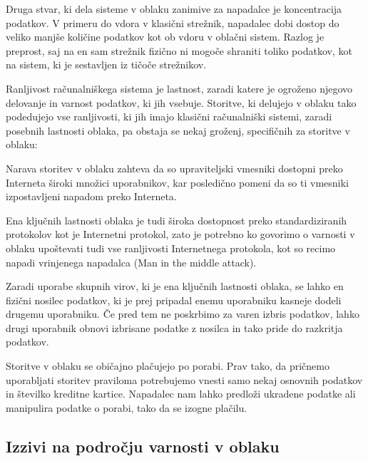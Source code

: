 \documentclass[12pt,a4paper,openany]{book}
\begin{document}
Druga stvar, ki dela sisteme v oblaku zanimive za napadalce je koncentracija podatkov. V primeru do vdora v klasični strežnik, napadalec dobi dostop do veliko manjše količine podatkov kot ob vdoru v oblačni sistem. Razlog je preprost, saj na en sam strežnik fizično ni mogoče shraniti toliko podatkov, kot na sistem, ki je sestavljen iz tičoče strežnikov.

Ranljivost računalniškega sistema je lastnost, zaradi katere je ogroženo njegovo delovanje in varnost podatkov, ki jih vsebuje. Storitve, ki delujejo v oblaku tako podedujejo vse ranljivosti, ki jih imajo klasični računalniški sistemi, zaradi posebnih lastnosti oblaka, pa obstaja se nekaj groženj, specifičnih za storitve v oblaku:

\begin{description}[style=nextline]

\item[Nedovoljen dostop do upraviteljskega in programskega vmesnika] Narava storitev v oblaku zahteva da so upraviteljski vmesniki dostopni preko Interneta široki množici uporabnikov, kar posledično pomeni da so ti vmesniki izpostavljeni napadom preko Interneta.

\item[Ranljivosti internetnega protokola] Ena ključnih lastnosti oblaka je tudi široka dostopnost preko standardiziranih protokolov kot je Internetni protokol, zato je potrebno ko govorimo o varnosti v oblaku upoštevati tudi vse ranljivosti Internetnega protokola, kot so recimo napadi vrinjenega napadalca (Man in the middle attack).

\item[Ranljivosti obnovitve podatkov] Zaradi uporabe skupnih virov, ki je ena ključnih lastnosti oblaka, se lahko en fizični nosilec podatkov, ki je prej pripadal enemu uporabniku kasneje dodeli drugemu uporabniku. Če pred tem ne poskrbimo za varen izbris podatkov, lahko drugi uporabnik obnovi izbrisane podatke z nosilca in tako pride do razkritja podatkov.

\item[Izogibanje merjenju in plačilu] Storitve v oblaku se običajno plačujejo po porabi. Prav tako, da pričnemo uporabljati storitev praviloma potrebujemo vnesti samo nekaj osnovnih podatkov in številko kreditne kartice. Napadalec nam lahko predloži ukradene podatke ali manipulira podatke o porabi, tako da se izogne plačilu.

\end{description}

\subsection{Izzivi na področju varnosti v oblaku}
\end{document}
